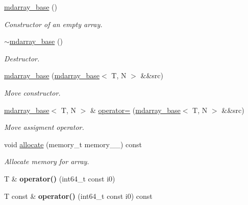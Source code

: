 \begin{DoxyCompactItemize}
\item 
\hyperlink{classsddk_1_1mdarray__base_aab9c83124b9266a2c852067585757def}{mdarray\+\_\+base} ()
\begin{DoxyCompactList}\small\item\em Constructor of an empty array. \end{DoxyCompactList}\item 
\hyperlink{classsddk_1_1mdarray__base_aceb56a51d14decb7061393b87b51ab42}{$\sim$mdarray\+\_\+base} ()
\begin{DoxyCompactList}\small\item\em Destructor. \end{DoxyCompactList}\item 
\hyperlink{classsddk_1_1mdarray__base_a96de06af65326d3e77a56831c0c3cfc8}{mdarray\+\_\+base} (\hyperlink{classsddk_1_1mdarray__base}{mdarray\+\_\+base}$<$ T, N $>$ \&\&src)
\begin{DoxyCompactList}\small\item\em Move constructor. \end{DoxyCompactList}\item 
\hyperlink{classsddk_1_1mdarray__base}{mdarray\+\_\+base}$<$ T, N $>$ \& \hyperlink{classsddk_1_1mdarray__base_a7f2d6333eeeb732869ccfdcf62941d37}{operator=} (\hyperlink{classsddk_1_1mdarray__base}{mdarray\+\_\+base}$<$ T, N $>$ \&\&src)
\begin{DoxyCompactList}\small\item\em Move assigment operator. \end{DoxyCompactList}\item 
void \hyperlink{classsddk_1_1mdarray__base_a9785e23d0d480259399c5f1ef01ed41d}{allocate} (memory\+\_\+t memory\+\_\+\+\_\+) const 
\begin{DoxyCompactList}\small\item\em Allocate memory for array. \end{DoxyCompactList}\item 
\hypertarget{classsddk_1_1mdarray__base_a2b6ed4a499a217f870206f144d52a29c}{}T \& {\bfseries operator()} (int64\+\_\+t const i0)\label{classsddk_1_1mdarray__base_a2b6ed4a499a217f870206f144d52a29c}

\item 
\hypertarget{classsddk_1_1mdarray__base_ad4f6fd5773cd1b082d8093ba12a3f7ca}{}T const \& {\bfseries operator()} (int64\+\_\+t const i0) const \label{classsddk_1_1mdarray__base_ad4f6fd5773cd1b082d8093ba12a3f7ca}


\end{DoxyCompactItemize}

